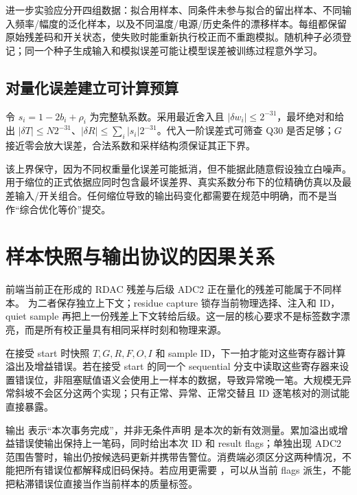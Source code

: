 进一步实验应分开四组数据：拟合用样本、同条件未参与拟合的留出样本、不同输入频率/幅度的泛化样本，以及不同温度/电源/历史条件的漂移样本。每组都保留原始残差码和开关状态，使失败时能重新执行校正而不重跑模拟。随机种子必须登记；同一个种子生成输入和模拟误差可能让模型误差被训练过程意外学习。

\subsection{对量化误差建立可计算预算}
令 \(s_i=1-2b_i+\rho_i\) 为完整轨系数。采用最近舍入且 \(|\delta w_i|\le 2^{-31}\)，最坏绝对和给出 \(|\delta T|\le N2^{-31}\)、\(|\delta R|\le\sum_i|s_i|2^{-31}\)。代入一阶误差式可筛查 Q30 是否足够；\(G\) 接近零会放大误差，合法系数和采样结构须保证其正下界。

该上界保守，因为不同权重量化误差可能抵消，但不能据此随意假设独立白噪声。用于缩位的正式依据应同时包含最坏误差界、真实系数分布下的位精确仿真以及最差输入/开关组合。任何缩位导致的输出码变化都需要在规范中明确，而不是当作“综合优化等价”提交。

\section{样本快照与输出协议的因果关系}
前端当前正在形成的 RDAC 残差与后级 ADC2 正在量化的残差可能属于不同样本。 为二者保存独立上下文；residue capture 锁存当前物理选择、注入和 ID，quiet sample 再把上一份残差上下文转给后级。这一层的核心要求不是标签数字漂亮，而是所有校正量具有相同采样时刻和物理来源。

 在接受 start 时快照 \(T,G,R,F,O,I\) 和 sample ID，下一拍才能对这些寄存器计算溢出及增益错误。若在接受 start 的同一个 sequential 分支中读取这些寄存器来设置错误位，非阻塞赋值语义会使用上一样本的数据，导致异常晚一笔。大规模无异常斜坡不会区分这两个实现；只有正常、异常、正常交替且 ID 逐笔核对的测试能直接暴露。

输出  表示“本次事务完成”，并非无条件声明  是本次的新有效测量。累加溢出或增益错误使输出保持上一笔码，同时给出本次 ID 和 result flags；单独出现 ADC2 范围告警时，输出仍按候选码更新并携带告警位。消费端必须区分这两种情况，不能把所有错误位都解释成旧码保持。若应用更需要 ，可以从当前 flags 派生，不能把粘滞错误位直接当作当前样本的质量标签。

